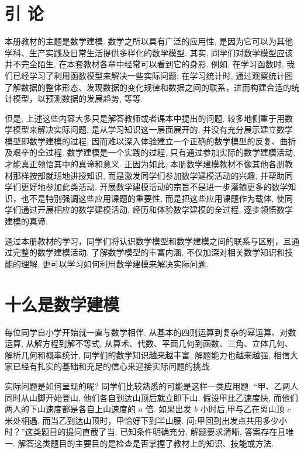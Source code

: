 \documentclass[10pt]{article}
\begin{document}
\section*{引 论}

本册教材的主题是数学建模. 数学之所以具有广泛的应用性, 是因为它可以为其他学科、生产实践及日常生活提供多样化的数学模型. 其实, 同学们对数学模型应该并不完全陌生, 在本套教材各章中经常可以看到它的身影. 例如, 在学习函数时, 我们已经学习了利用函数模型来解决一些实际问题; 在学习统计时, 通过观察统计图了解数据的整体形态、发现数据的变化规律和数据之间的联系，进而构建合适的统计模型，以预测数据的发展趋势, 等等.

但是, 上述这些内容大多只是解答教师或者课本中提出的问题, 较多地侧重于用数学模型来解决实际问题, 是从学习知识这一层面展开的, 并没有充分展示建立数学模型即数学建模的过程, 因而难以深入体验建立一个正确的数学模型的反复、曲折及艰辛的全过程. 数学建模是一个实践的过程, 只有通过参加实际的数学建模活动, 才能真正领悟其中的真谛和意义. 正因为如此, 本册数学建模教材不像其他各册教材那样按部就班地讲授知识, 而是激发同学们参加数学建模活动的兴趣, 并帮助同学们更好地参加此类活动. 开展数学建模活动的宗旨不是进一步灌输更多的数学知识，也不是特别强调这些应用课题的重要性, 而是把这些应用课题作为载体, 使同学们通过开展相应的数学建模活动, 经历和体验数学建模的全过程, 逐步领悟数学建模的真谛.

通过本册教材的学习，同学们将认识数学模型和数学建模之间的联系与区别，且通过完整的数学建模活动, 了解数学模型的丰富内涵, 不仅加深对相关数学知识和技能的理解, 更可以学习如何利用数学建模来解决实际问题.

\section*{十么是数学建模}

每位同学自小学开始就一直与数学相伴. 从基本的四则运算到复杂的幂运算、对数运算, 从解方程到解不等式, 从算术、代数、平面几何到函数、三角、立体几何、解析几何和概率统计, 同学们的数学知识越来越丰富, 解题能力也越来越强, 相信大家已经有扎实的基础和充足的信心来迎接实际问题的挑战.

实际问题是如何呈现的呢? 同学们比较熟悉的可能是这样一类应用题: “甲、乙两人同时从山脚开始登山, 他们各自到达山顶后就立即下山. 假设甲比乙速度快, 而他们两人的下山速度都是各自上山速度的 \(a\) 倍. 如果出发 \(b\) 小时后,甲与乙在离山顶 \(c\) 米处相遇, 而当乙到达山顶时，甲恰好下到半山腰. 问:甲回到出发点共用多少小时？”这类题目的提问直截了当, 已知条件明确充分, 解题要求清晰, 答案存在且唯一. 解答这类题目的主要目的是检查是否掌握了教材上的知识、技能或方法.
\end{document}
